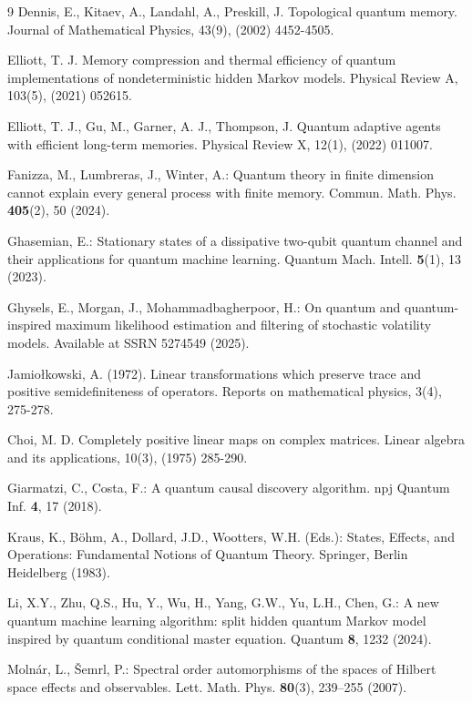 \documentclass[11pt, reco]{article}
\begin{document}
\begin{thebibliography}{9}
  Dennis, E., Kitaev, A., Landahl, A.,   Preskill, J. Topological quantum memory. Journal of Mathematical Physics, 43(9),   (2002) 4452-4505.

 Elliott, T. J.  Memory compression and thermal efficiency of quantum implementations of nondeterministic hidden Markov models. Physical Review A, 103(5), (2021) 052615.

  Elliott, T. J., Gu, M., Garner, A. J.,   Thompson, J. Quantum adaptive agents with efficient long-term memories. Physical Review X, 12(1),    (2022) 011007.

Fanizza, M., Lumbreras, J., Winter, A.:
Quantum theory in finite dimension cannot explain every general process with finite memory.
Commun. Math. Phys. \textbf{405}(2), 50 (2024).

Ghasemian, E.:
Stationary states of a dissipative two-qubit quantum channel and their applications for quantum machine learning.
Quantum Mach. Intell. \textbf{5}(1), 13 (2023).

Ghysels, E., Morgan, J., Mohammadbagherpoor, H.:
On quantum and quantum-inspired maximum likelihood estimation and filtering of stochastic volatility models.
Available at SSRN 5274549 (2025).

Jamiołkowski, A. (1972). Linear transformations which preserve trace and positive semidefiniteness of operators. Reports on mathematical physics, 3(4), 275-278.

 Choi, M. D. Completely positive linear maps on complex matrices. Linear algebra and its applications, 10(3),   (1975) 285-290.

Giarmatzi, C., Costa, F.:
A quantum causal discovery algorithm.
npj Quantum Inf. \textbf{4}, 17 (2018).

Kraus, K., Böhm, A., Dollard, J.D., Wootters, W.H. (Eds.):
States, Effects, and Operations: Fundamental Notions of Quantum Theory.
Springer, Berlin Heidelberg (1983).

Li, X.Y., Zhu, Q.S., Hu, Y., Wu, H., Yang, G.W., Yu, L.H., Chen, G.:
A new quantum machine learning algorithm: split hidden quantum Markov model inspired by quantum conditional master equation.
Quantum \textbf{8}, 1232 (2024).

Molnár, L., Šemrl, P.:
Spectral order automorphisms of the spaces of Hilbert space effects and observables.
Lett. Math. Phys. \textbf{80}(3), 239–255 (2007).


\end{thebibliography}
\end{document}
